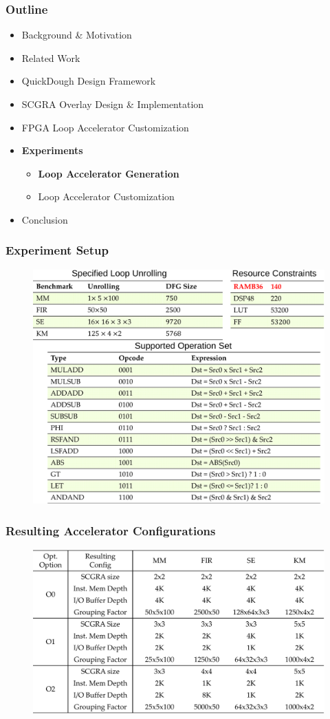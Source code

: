 \documentclass[accentcolor=tud1a,colorbacktitle,inverttitle,landscape,german,presentation,t]{tudbeamer}
\begin{document}
  \begin{frame}
  \frametitle{Outline}
  \begin{itemize}
  \setlength{\itemsep}{6pt}
  \item Background \& Motivation
  \item Related Work
  \item QuickDough Design Framework
  \item SCGRA Overlay Design \& Implementation
  \item FPGA Loop Accelerator Customization
  \item \textbf{Experiments}
  \begin{itemize}
    \setlength{\itemsep}{6pt}
    \item \textbf{Loop Accelerator Generation}
    \item Loop Accelerator Customization
  \end{itemize}
  \item Conclusion
  \end{itemize}
  \end{frame}

  \begin{frame}
  \frametitle{Experiment Setup}
  \vspace{-1em}
  \begin{figure}
    \includegraphics[width=0.8\linewidth]{compile-setup}
  \end{figure}
  \end{frame}

  \begin{frame}
  \frametitle{Resulting Accelerator Configurations}
  \begin{figure}
    \includegraphics[width=0.9\linewidth]{accel-config}
  \end{figure}
  \end{frame}
\end{document}
